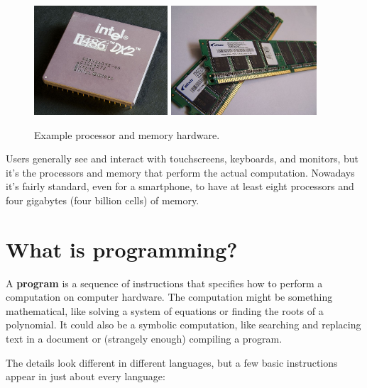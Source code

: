 \begin{figure}[!ht]
\begin{center}
\includegraphics[height=11em]{figs/CPU.jpg}
\hspace{2em}
\includegraphics[height=11em]{figs/RAM.jpg}
\caption{Example processor and memory hardware.}
\label{fig.cpuram}
\end{center}
\end{figure}

Users generally see and interact with touchscreens, keyboards, and monitors, but it's the processors and memory that perform the actual computation.
Nowadays it's fairly standard, even for a smartphone, to have at least eight processors and four gigabytes (four billion cells) of memory.


\section{What is programming?}


A {\bf program} is a sequence of instructions that specifies how to perform a computation on computer hardware.
The computation might be something mathematical, like solving a system of equations or finding the roots of a polynomial.
It could also be a symbolic computation, like searching and replacing text in a document or (strangely enough) compiling a program.

The details look different in different languages, but a few basic instructions appear in just about every language:

